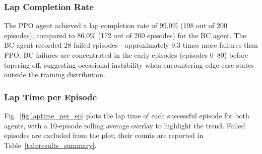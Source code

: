 \documentclass[conference]{IEEEtran}
\begin{document}
\subsubsection{Lap Completion Rate}

The PPO agent achieved a lap completion rate of 99.0\% (198 out of 200 episodes), compared to 86.0\% (172 out of 200 episodes) for the BC agent. The BC agent recorded 28 failed episodes---approximately 9.3 times more failures than PPO. BC failures are concentrated in the early episodes (episodes 0--80) before tapering off, suggesting occasional instability when encountering edge-case states outside the training distribution.

\subsubsection{Lap Time per Episode}

Fig.~\ref{fig:laptime_per_ep} plots the lap time of each successful episode for both agents, with a 10-episode rolling average overlay to highlight the trend. Failed episodes are excluded from the plot; their counts are reported in Table~\ref{tab:results_summary}.
\end{document}
